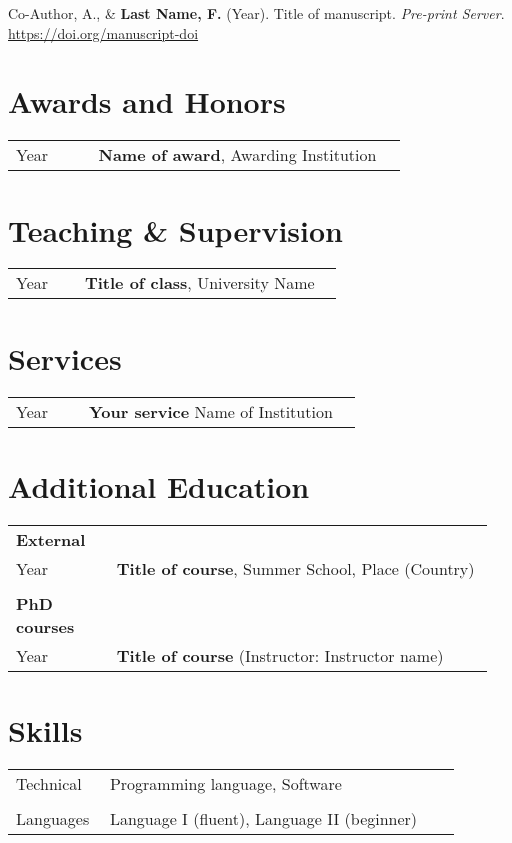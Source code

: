 \documentclass[11pt, a4paper, colorlinks=true, linkcolor=blue, citecolor=blue, urlcolor=blue]{article}
\begin{document}
    \noindent Co-Author, A., \& \textbf{Last Name, F.} (Year). Title of manuscript. \textit{Pre-print Server}. \newline \href{https://doi.org/manuscript-doi}{https://doi.org/manuscript-doi}

\section*{Awards and Honors}
\begin{tabular}{p{0.2\linewidth} p{0.75\linewidth}}
Year & \textbf{Name of award}, Awarding Institution \\
\end{tabular}

\section*{Teaching \& Supervision}
\begin{tabular}{p{0.2\linewidth} p{0.75\linewidth}}
Year & \textbf{Title of class}, University Name \\
\end{tabular}

\section*{Services}
\begin{tabular}{p{0.2\linewidth} p{0.75\linewidth}}
Year & \textbf{Your service} Name of Institution  \\
\end{tabular}

\section*{Additional Education}
\begin{tabular}{p{0.2\linewidth} p{0.75\linewidth}}
\textbf{External} & \\
Year & \textbf{Title of course}, Summer School, Place (Country) \\
& \\
\textbf{PhD courses} & \\
Year & \textbf{Title of course} (Instructor: Instructor name) \\
\end{tabular}

\section*{Skills}
\begin{tabular}{p{0.2\linewidth} p{0.75\linewidth}}
Technical & Programming language, Software \\
& \\
Languages & Language I (fluent), Language II (beginner)
\end{tabular}
\end{document}
